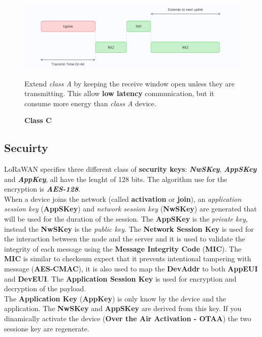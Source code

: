 \begin{figure}[h]
    \centering
    \begin{minipage}[t]{0.45\textwidth}
        \centering
        \includegraphics[width=\textwidth]{img/lora_classC}
        \caption{\textbf{Class C}}

        \begin{flushleft}
            Extend \textit{class A} by keeping the receive window open unless they are transmitting. This allow \textbf{low latency} communication, but it consume more energy than \textit{class A} device.
        \end{flushleft}
    \end{minipage}
\end{figure}

\subsection{Secuirty}
LoRaWAN specifies three different class of \textbf{security keys}: \textbf{\textit{NwSKey}}, \textbf{\textit{AppSKey}} and \textbf{\textit{AppKey}}, all have the lenght of 128 bits. The algorithm use for the encryption is \textbf{\textit{AES-128}}. \\
When a device joins the network (called \textbf{activation} or \textbf{join}), an \textit{application session key} (\textbf{AppSKey}) and \textit{network session key} (\textbf{NwSKey}) are generated that will be used for the duration of the session. The \textbf{AppSKey} is the \textit{private key}, instead the \textbf{NwSKey} is the \textit{public key}. The \textbf{Network Session Key} is used for the interaction between the node and the server and it is used to validate the integrity of each message using the \textbf{Message Integrity Code} (\textbf{MIC}). The \textbf{MIC} is similar to checksum expect that it prevents intentional tampering with message (\textbf{AES-CMAC}), it is also used to map the \textbf{DevAddr} to both \textbf{AppEUI} and \textbf{DevEUI}. The \textbf{Application Session Key} is used for encryption and decryption of the payload. \\
The \textbf{Application Key} (\textbf{AppKey}) is only know by the device and the application. The \textbf{NwSKey} and \textbf{AppSKey} are derived from this key. If you dinamically activate the device (\textbf{Over the Air Activation - OTAA}) the two sessione key are regenerate.

